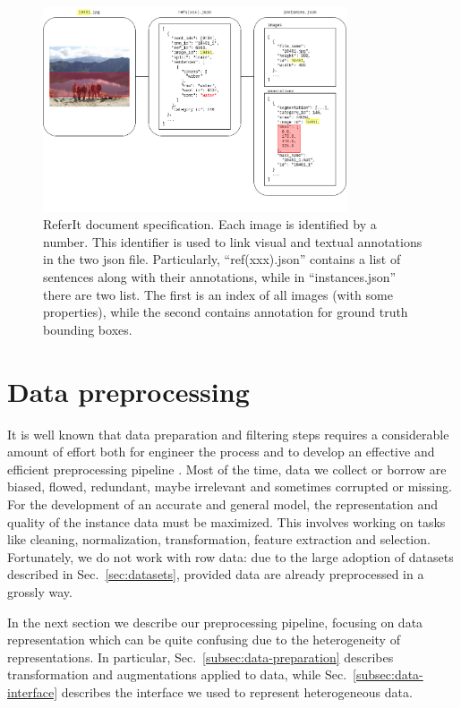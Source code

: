 \begin{figure}
  \centering
  \includegraphics[width=0.8\textwidth]{figures/referit-document-specification.png}
  \caption[ReferIt document specification]{ReferIt document
  specification. Each image is identified by a number. This identifier
  is used to link visual and textual annotations in the two json file.
  Particularly, ``ref(xxx).json'' contains a list of sentences along
  with their annotations, while in ``instances.json'' there are two
  list. The first is an index of all images (with some properties),
  while the second contains annotation for ground truth bounding
  boxes. }
  \label{fig:referit-technical-data-representation}
\end{figure}

\section{Data preprocessing}

It is well known that data preparation and filtering steps requires a
considerable amount of effort both for engineer the process and to
develop an effective and efficient preprocessing pipeline
\cite{kotsiantis2006data}. Most of the time, data we collect or borrow
are biased, flowed, redundant, maybe irrelevant and sometimes
corrupted or missing. For the development of an accurate and general
model, the representation and quality of the instance data must be
maximized. This involves working on tasks like cleaning,
normalization, transformation, feature extraction and selection.
Fortunately, we do not work with row data: due to the large adoption
of datasets described in Sec.~\ref{sec:datasets}, provided data are
already preprocessed in a grossly way.

In the next section we describe our preprocessing pipeline, focusing
on data representation which can be quite confusing due to the
heterogeneity of representations. In particular,
Sec.~\ref{subsec:data-preparation} describes transformation and
augmentations applied to data, while Sec.~\ref{subsec:data-interface}
describes the interface we used to represent heterogeneous data.

